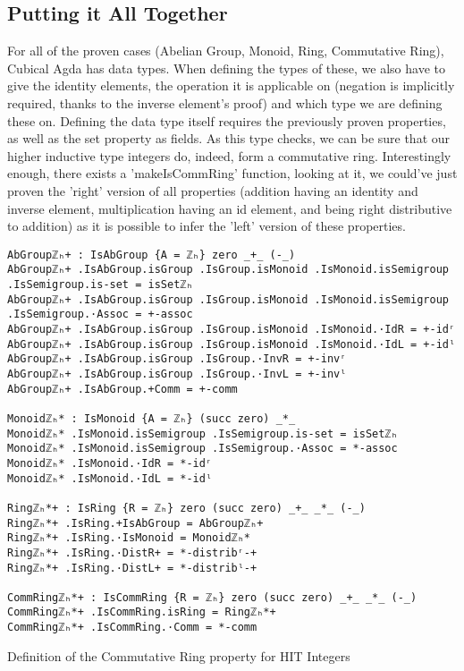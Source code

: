 \begin{listing}[H]
\section{Putting it All Together}
For all of the proven cases (Abelian Group, Monoid, Ring, Commutative Ring), Cubical Agda has data types. When defining the types of these, we also have to give the identity elements, the operation it is applicable on (negation is implicitly required, thanks to the inverse element's proof) and which type we are defining these on. Defining the data type itself requires the previously proven properties, as well as the set property as fields.
As this type checks, we can be sure that our higher inductive type integers do, indeed, form a commutative ring.
Interestingly enough, there exists a 'makeIsCommRing' function, looking at it, we could've just proven the 'right' version of all properties (addition having an identity and inverse element, multiplication having an id element, and being right distributive to addition) as it is possible to infer the 'left' version of these properties.

\begin{verbatim}
AbGroupℤₕ+ : IsAbGroup {A = ℤₕ} zero _+_ (-_)
AbGroupℤₕ+ .IsAbGroup.isGroup .IsGroup.isMonoid .IsMonoid.isSemigroup .IsSemigroup.is-set = isSetℤₕ
AbGroupℤₕ+ .IsAbGroup.isGroup .IsGroup.isMonoid .IsMonoid.isSemigroup .IsSemigroup.·Assoc = +-assoc
AbGroupℤₕ+ .IsAbGroup.isGroup .IsGroup.isMonoid .IsMonoid.·IdR = +-idʳ
AbGroupℤₕ+ .IsAbGroup.isGroup .IsGroup.isMonoid .IsMonoid.·IdL = +-idˡ
AbGroupℤₕ+ .IsAbGroup.isGroup .IsGroup.·InvR = +-invʳ
AbGroupℤₕ+ .IsAbGroup.isGroup .IsGroup.·InvL = +-invˡ
AbGroupℤₕ+ .IsAbGroup.+Comm = +-comm

Monoidℤₕ* : IsMonoid {A = ℤₕ} (succ zero) _*_
Monoidℤₕ* .IsMonoid.isSemigroup .IsSemigroup.is-set = isSetℤₕ
Monoidℤₕ* .IsMonoid.isSemigroup .IsSemigroup.·Assoc = *-assoc
Monoidℤₕ* .IsMonoid.·IdR = *-idʳ
Monoidℤₕ* .IsMonoid.·IdL = *-idˡ

Ringℤₕ*+ : IsRing {R = ℤₕ} zero (succ zero) _+_ _*_ (-_)
Ringℤₕ*+ .IsRing.+IsAbGroup = AbGroupℤₕ+
Ringℤₕ*+ .IsRing.·IsMonoid = Monoidℤₕ*
Ringℤₕ*+ .IsRing.·DistR+ = *-distribʳ-+
Ringℤₕ*+ .IsRing.·DistL+ = *-distribˡ-+

CommRingℤₕ*+ : IsCommRing {R = ℤₕ} zero (succ zero) _+_ _*_ (-_)
CommRingℤₕ*+ .IsCommRing.isRing = Ringℤₕ*+
CommRingℤₕ*+ .IsCommRing.·Comm = *-comm
\end{verbatim}
\caption{Definition of the Commutative Ring property for HIT Integers}
\end{listing}

